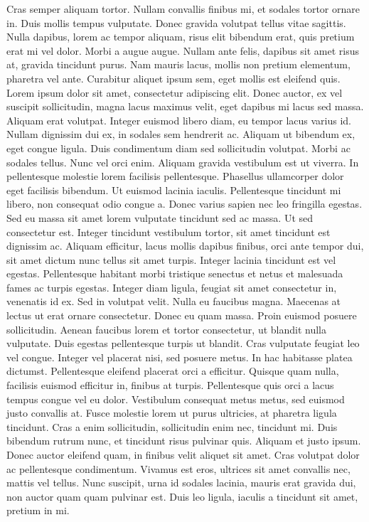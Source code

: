 {Cras semper aliquam tortor. Nullam convallis finibus mi, et sodales tortor ornare in. Duis mollis tempus vulputate. Donec gravida volutpat tellus vitae sagittis. Nulla dapibus, lorem ac tempor aliquam, risus elit bibendum erat, quis pretium erat mi vel dolor. Morbi a augue augue. Nullam ante felis, dapibus sit amet risus at, gravida tincidunt purus. Nam mauris lacus, mollis non pretium elementum, pharetra vel ante. Curabitur aliquet ipsum sem, eget mollis est eleifend quis.
Lorem ipsum dolor sit amet, consectetur adipiscing elit. Donec auctor, ex vel suscipit sollicitudin, magna lacus maximus velit, eget dapibus mi lacus sed massa. Aliquam erat volutpat. Integer euismod libero diam, eu tempor lacus varius id. Nullam dignissim dui ex, in sodales sem hendrerit ac. Aliquam ut bibendum ex, eget congue ligula. Duis condimentum diam sed sollicitudin volutpat. Morbi ac sodales tellus. Nunc vel orci enim. Aliquam gravida vestibulum est ut viverra. In pellentesque molestie lorem facilisis pellentesque. Phasellus ullamcorper dolor eget facilisis bibendum. Ut euismod lacinia iaculis. Pellentesque tincidunt mi libero, non consequat odio congue a. Donec varius sapien nec leo fringilla egestas. Sed eu massa sit amet lorem vulputate tincidunt sed ac massa.
Ut sed consectetur est. Integer tincidunt vestibulum tortor, sit amet tincidunt est dignissim ac. Aliquam efficitur, lacus mollis dapibus finibus, orci ante tempor dui, sit amet dictum nunc tellus sit amet turpis. Integer lacinia tincidunt est vel egestas. Pellentesque habitant morbi tristique senectus et netus et malesuada fames ac turpis egestas. Integer diam ligula, feugiat sit amet consectetur in, venenatis id ex. Sed in volutpat velit. Nulla eu faucibus magna. Maecenas at lectus ut erat ornare consectetur. Donec eu quam massa. Proin euismod posuere sollicitudin. Aenean faucibus lorem et tortor consectetur, ut blandit nulla vulputate. Duis egestas pellentesque turpis ut blandit.
Cras vulputate feugiat leo vel congue. Integer vel placerat nisi, sed posuere metus. In hac habitasse platea dictumst. Pellentesque eleifend placerat orci a efficitur. Quisque quam nulla, facilisis euismod efficitur in, finibus at turpis. Pellentesque quis orci a lacus tempus congue vel eu dolor. Vestibulum consequat metus metus, sed euismod justo convallis at. Fusce molestie lorem ut purus ultricies, at pharetra ligula tincidunt. Cras a enim sollicitudin, sollicitudin enim nec, tincidunt mi. Duis bibendum rutrum nunc, et tincidunt risus pulvinar quis. Aliquam et justo ipsum. Donec auctor eleifend quam, in finibus velit aliquet sit amet. Cras volutpat dolor ac pellentesque condimentum. Vivamus est eros, ultrices sit amet convallis nec, mattis vel tellus. Nunc suscipit, urna id sodales lacinia, mauris erat gravida dui, non auctor quam quam pulvinar est. Duis leo ligula, iaculis a tincidunt sit amet, pretium in mi.
}

